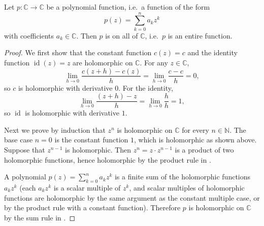 \begin{proposition} \label{proposition:complex_polynomials_are_entire}
    Let $p : \mathbb{C} \to \mathbb{C}$ be a polynomial function, i.e.\ a function of the form
    $$p(z) = \sum_{k=0}^n a_k z^k$$
    with coefficients $a_k \in \mathbb{C}$. Then $p$ is  on all of $\mathbb{C}$, i.e.\ $p$ is an entire function.
\end{proposition}

\begin{proof}
    We first show that the constant function $c(z) = c$ and the identity function $\operatorname{id}(z) = z$ are holomorphic on $\mathbb{C}$. For any $z \in \mathbb{C}$,
    $$\lim_{h \to 0} \frac{c(z+h) - c(z)}{h} = \lim_{h \to 0} \frac{c - c}{h} = 0,$$
    so $c$ is holomorphic with derivative $0$. For the identity,
    $$\lim_{h \to 0} \frac{(z+h) - z}{h} = \lim_{h \to 0} \frac{h}{h} = 1,$$
    so $\operatorname{id}$ is holomorphic with derivative $1$.

    Next we prove by induction that $z^n$ is holomorphic on $\mathbb{C}$ for every $n \in \mathbb{N}$. The base case $n = 0$ is the constant function $1$, which is holomorphic as shown above. Suppose that $z^{n-1}$ is holomorphic. Then $z^n = z \cdot z^{n-1}$ is a product of two holomorphic functions, hence holomorphic by the product rule in .

    A polynomial $p(z) = \sum_{k=0}^n a_k z^k$ is a finite sum of the holomorphic functions $a_k z^k$ (each $a_k z^k$ is a scalar multiple of $z^k$, and scalar multiples of holomorphic functions are holomorphic by the same argument as the constant multiple case, or by the product rule with a constant function). Therefore $p$ is holomorphic on $\mathbb{C}$ by the sum rule in .
\end{proof}